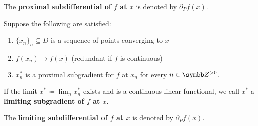 \begin{definition}
\begin{defenum}
    The \textbf{proximal subdifferential of \( f \) at \( x \)} is denoted by \( \partial_P f(x) \).

    \cite[definition 11.10]{Clarke2013} Suppose the following are satisfied:
    \begin{enumerate}
      \item \( \{ x_n \}_n \subseteq D \) is a sequence of points converging to \( x \)
      \item \( f(x_n) \to f(x) \) (redundant if \( f \) is continuous)
      \item \( x_n^* \) is a proximal subgradient for \( f \) at \( x_n \) for every \( n \in \Z^{>0} \).
    \end{enumerate}

    If the limit \( x^* \coloneqq \lim_n x_n^* \) exists and is a continuous linear functional, we call \( x^* \) a \textbf{limiting subgradient of \( f \) at \( x \)}.

    The \textbf{limiting subdifferential of \( f \) at \( x \)} is denoted by \( \partial_P f(x) \).
  \end{defenum}
\end{definition}
